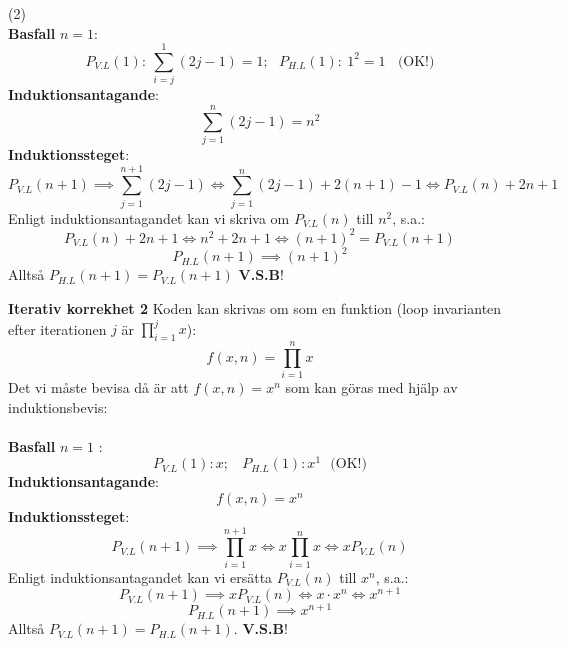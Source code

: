 \documentclass{report}
\begin{document}
\sol (2)\\
\textbf{Basfall} $n=1$:
\begin{equation*}
P_{V.L}(1):\:\sum_{i=j}^{1} (2j-1) = 1;\:\:\:P_{H.L}(1):\: 1^2 = 1\:\:\:\:\text{(OK!)}
\end{equation*}
\textbf{Induktionsantagande}:
\begin{equation*}
\sum_{j=1}^{n} (2j-1)= n^2
\end{equation*}
\textbf{Induktionssteget}:
\begin{equation*}
P_{V.L}(n+1) \implies \sum_{j=1}^{n+1}(2j-1) \iff \sum_{j=1}^{n}(2j-1) + 2(n+1)-1 \iff P_{V.L}(n) + 2n+1
\end{equation*}
Enligt induktionsantagandet kan vi skriva om $P_{V.L}(n)$ till $n^2$, s.a.:
\begin{equation*}
P_{V.L}(n) + 2n+1 \iff n^2 + 2n + 1 \iff (n+1)^2 = P_{V.L}(n+1)
\end{equation*}
\begin{equation*}
P_{H.L}(n+1) \implies (n+1)^2
\end{equation*}
Alltså $P_{H.L}(n+1) = P_{V.L}(n+1)$ \textbf{V.S.B}!

\pagebreak 

\qs{}
{
\textbf{Iterativ korrekhet 2}
}
\sol Koden kan skrivas om som en funktion (loop invarianten efter iterationen $ j $ är $\prod_{i = 1}^{j} x $):
\begin{equation*}
	f(x, n) = \prod_{i = 1}^{n} x 
\end{equation*}
Det vi måste bevisa då är att $ f(x,n) = x^n $ som kan göras med hjälp av induktionsbevis:\\\\

\noindent
\textbf{Basfall} $ n = 1 $ :
\begin{equation*}
		P_{V.L}(1): x;\:\:\:\: P_{H.L}(1): x^1\:\:\: \text{(OK!)}   
\end{equation*}
\textbf{Induktionsantagande}:
\begin{equation*}
f(x,n) = x^n
\end{equation*}
\textbf{Induktionssteget}:
\begin{equation*}
	P_{V.L}(n+1) \implies \prod_{i=1}^{n+1}x \iff x\prod_{i=1}^{n}x \iff x P_{V.L}(n)
\end{equation*}
Enligt induktionsantagandet kan vi ersätta $ P_{V.L}(n) $ till $ x^n $, s.a.:
\begin{equation*}
	P_{V.L}(n+1) \implies xP_{V.L}(n) \iff x \cdot x^n \iff x^{n+1}
\end{equation*}
\begin{equation*}
	P_{H.L}(n+1) \implies x^{n+1}
\end{equation*}
Alltså $ P_{V.L}(n+1) = P_{H.L}(n+1) $. \textbf{V.S.B}!\\\\
\end{document}
